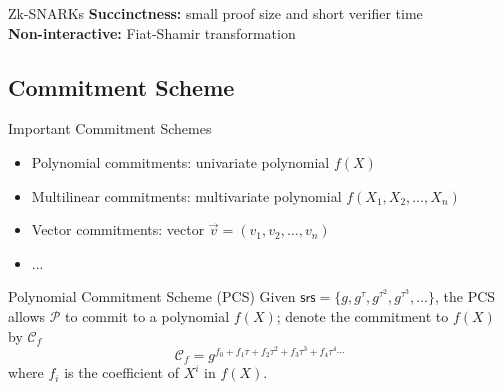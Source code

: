 \documentclass{beamer}
\newcommand{\cm}{\mathcal{C}} %
\begin{document}
  \begin{frame}{Zk-SNARKs}
    \textbf{Succinctness:} small proof size and short verifier time \\
    \textbf{Non-interactive:} Fiat-Shamir transformation
  \end{frame}

  \subsection{Commitment Scheme}
  \begin{frame}{Important Commitment Schemes}
    \begin{itemize}
      \item Polynomial commitments: univariate polynomial $f(X)$
      \item Multilinear commitments: multivariate polynomial $f(X_1,X_2,\dots,X_n)$
      \item Vector commitments: vector $\overrightarrow{v}=(v_1,v_2,\dots,v_n)$
      \item ...
    \end{itemize}
  \end{frame}

  \begin{frame}{Polynomial Commitment Scheme (PCS)}
    Given $\mathsf{srs}=\{g,g^\tau,g^{\tau^2},g^{\tau^3},\dots\}$, the PCS allows $\mathcal{P}$ to commit to a polynomial $f(X)$; denote the commitment to $f(X)$ by $\cm_f$
    $$
    \cm_f=g^{f_0+f_1\tau+f_2\tau^2+f_3\tau^3+f_4\tau^4\cdots}
    $$
    where $f_i$ is the coefficient of $X^i$ in $f(X)$.
  \end{frame}
\end{document}
